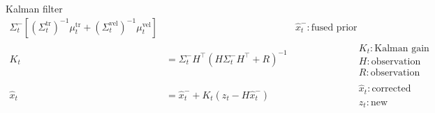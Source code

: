 \begin{frame}[allowframebreaks]{Kalman filter}
\[\begin{aligned}
            \Sigma^{-}_{t}
            \left[
                (\Sigma^{\mathrm{tr}}_{t})^{-1}\mu^{\mathrm{tr}}_{t}
                +
                (\Sigma^{\mathrm{vel}}_{t})^{-1}\mu^{\mathrm{vel}}_{t}
            \right]
            &&
            \hat{x}^{-}_{t}: \text{fused prior estimate}
            \\[8pt]
            K_{t}
            &=
            \Sigma^{-}_{t}H^{\top}
            \left(
                H\Sigma^{-}_{t}H^{\top}
                +
                R
            \right)^{-1}
            &&
            \begin{array}{l}
                K_{t}: \text{Kalman gain} \\
                H: \text{observation matrix} \\
                R: \text{observation noise covariance}
            \end{array}
            \\[8pt]
            \hat{x}_{t}
            &=
            \hat{x}^{-}_{t}
            +
            K_{t}
            \left(
                z_{t}
                -
                H\hat{x}^{-}_{t}
            \right)
            &&
            \begin{array}{l}
                \hat{x}_{t}: \text{corrected estimate} \\
                z_{t}: \text{new observation}
            \end{array}
        \end{aligned}
    \]
\end{frame}